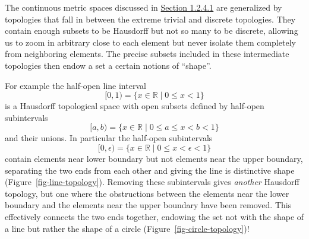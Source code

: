 \documentclass[
  letterpaper,
  DIV=11,
  numbers=noendperiod]{scrartcl}
\begin{document}
The continuous metric spaces discussed in \href{@sec:open-balls}{Section
1.2.4.1} are generalized by topologies that fall in between the extreme
trivial and discrete topologies. They contain enough subsets to be
Hausdorff but not so many to be discrete, allowing us to zoom in
arbitrary close to each element but never isolate them completely from
neighboring elements. The precise subsets included in these intermediate
topologies then endow a set a certain notions of ``shape''.

For example the half-open line interval \[
[0, 1) = \{ x \in \mathbb{R} \mid 0 \le x < 1 \}
\] is a Hausdorff topological space with open subsets defined by
half-open subintervals \[
[a, b) = \{ x \in \mathbb{R} \mid 0 \le a \le x < b < 1 \}
\] and their unions. In particular the half-open subintervals \[
[0, \epsilon) = \{ x \in \mathbb{R} \mid 0 \le x < \epsilon < 1 \}
\] contain elements near lower boundary but not elements near the upper
boundary, separating the two ends from each other and giving the line is
distinctive shape (Figure~\ref{fig-line-topology}). Removing these
subintervals gives \emph{another} Hausdorff topology, but one where the
obstructions between the elements near the lower boundary and the
elements near the upper boundary have been removed. This effectively
connects the two ends together, endowing the set not with the shape of a
line but rather the shape of a circle
(Figure~\ref{fig-circle-topology})!
\end{document}
